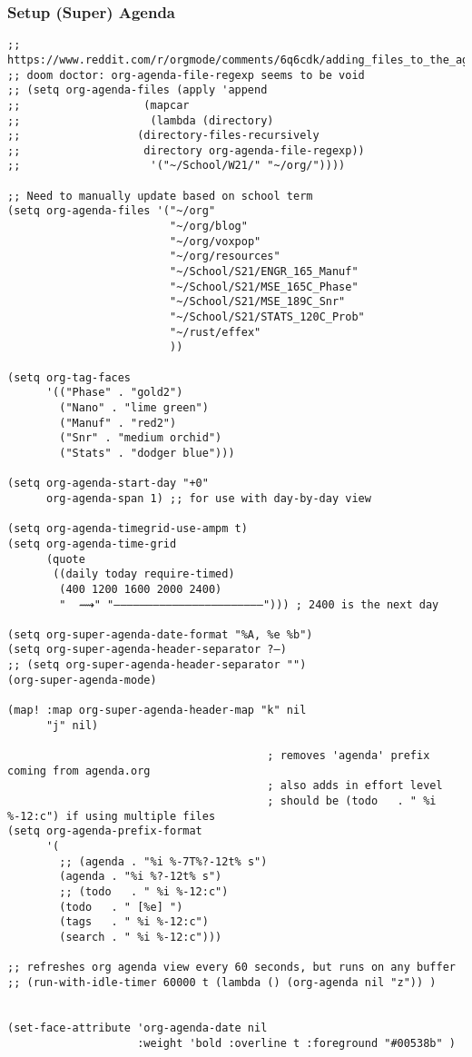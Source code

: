 \documentclass[8pt]{article}
\begin{document}
\subsubsection{Setup (Super) Agenda}
\label{sec:orgaba2415}
\begin{verbatim}
;; https://www.reddit.com/r/orgmode/comments/6q6cdk/adding_files_to_the_agenda_list_recursively/
;; doom doctor: org-agenda-file-regexp seems to be void
;; (setq org-agenda-files (apply 'append
;;                   (mapcar
;;                    (lambda (directory)
;;                  (directory-files-recursively
;;                   directory org-agenda-file-regexp))
;;                    '("~/School/W21/" "~/org/"))))

;; Need to manually update based on school term
(setq org-agenda-files '("~/org"
                         "~/org/blog"
                         "~/org/voxpop"
                         "~/org/resources"
                         "~/School/S21/ENGR_165_Manuf"
                         "~/School/S21/MSE_165C_Phase"
                         "~/School/S21/MSE_189C_Snr"
                         "~/School/S21/STATS_120C_Prob"
                         "~/rust/effex"
                         ))

(setq org-tag-faces
      '(("Phase" . "gold2")
        ("Nano" . "lime green")
        ("Manuf" . "red2")
        ("Snr" . "medium orchid")
        ("Stats" . "dodger blue")))

(setq org-agenda-start-day "+0"
      org-agenda-span 1) ;; for use with day-by-day view

(setq org-agenda-timegrid-use-ampm t)
(setq org-agenda-time-grid
      (quote
       ((daily today require-timed)
        (400 1200 1600 2000 2400)
        "  ⟿" "―――――――――――――――――――――――"))) ; 2400 is the next day

(setq org-super-agenda-date-format "%A, %e %b")
(setq org-super-agenda-header-separator ?―)
;; (setq org-super-agenda-header-separator "")
(org-super-agenda-mode)

(map! :map org-super-agenda-header-map "k" nil
      "j" nil)

                                        ; removes 'agenda' prefix coming from agenda.org
                                        ; also adds in effort level
                                        ; should be (todo   . " %i %-12:c") if using multiple files
(setq org-agenda-prefix-format
      '(
        ;; (agenda . "%i %-7T%?-12t% s")
        (agenda . "%i %?-12t% s")
        ;; (todo   . " %i %-12:c")
        (todo   . " [%e] ")
        (tags   . " %i %-12:c")
        (search . " %i %-12:c")))

;; refreshes org agenda view every 60 seconds, but runs on any buffer
;; (run-with-idle-timer 60000 t (lambda () (org-agenda nil "z")) )


(set-face-attribute 'org-agenda-date nil
                    :weight 'bold :overline t :foreground "#00538b" )
\end{verbatim}
\end{document}
